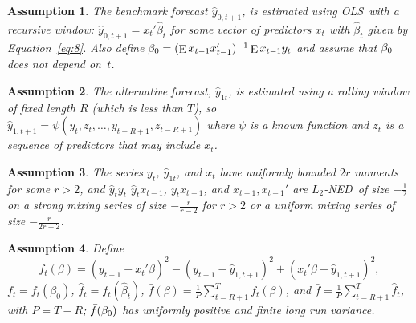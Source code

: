 \documentclass[12pt,fleqn]{article}
\newtheorem{asmp}{Assumption}
\theoremstyle{definition}
\DeclareMathOperator{\E}{E}
\newcommand{\btrue}[1][]{\if#1*\hat\beta_{T+1}\else\beta_0\fi}
\newcommand{\osum}[1]{\sum_{#1=R+1}^T}
\newcommand{\oavg}[1]{\tfrac{1}{P} \osum{#1}}
\newcommand{\ned}{NED}
\newcommand{\ols}{OLS}
\begin{document}
\begin{asmp}\label{a1}%
  The benchmark forecast $\hat{y}_{0,t+1}$, is estimated using \ols\
  with a recursive window: $\hat{y}_{0,t+1} = x_t'\hat{\beta}_t$ for
  some vector of predictors $x_t$ with $\hat{\beta}_t$ given by
  Equation~\eqref{eq:8}.  Also define $\btrue = (\E x_{t-1}
  x_{t-1}')^{-1} \E x_{t-1} y_t$ and assume that $\btrue$ does not
  depend on~$t$.
\end{asmp}

\begin{asmp}\label{a2}%
  The alternative forecast, $\hat{y}_{1t}$, is estimated using a
  rolling window of fixed length $R$ (which is less than $T$), so
  $\hat{y}_{1,t+1} = \psi(y_t,z_t,\dots,y_{t-R+1}, z_{t-R+1})$ where
  $\psi$ is a known function and $z_t$ is a sequence of predictors
  that may include $x_t$.
\end{asmp}

\begin{asmp}\label{a3}%
  The series $y_t$, $\hat{y}_{1t}$, and $x_t$ have uniformly bounded
  $2 r$ moments for some $r > 2$, and $\hat y_t y_t$ $\hat y_t
  x_{t-1}$, $y_t x_{t-1}$, and $x_{t-1}, x_{t-1}'$ are $L_2$-\ned\ of
  size $-\frac12$ on a strong mixing series of size $-\frac{r}{r-2}$
  for $r>2$ or a uniform mixing series of size $-\frac{r}{2r-2}$.
\end{asmp}

\begin{asmp}\label{a4}%
  Define \[f_t(\beta) = (y_{t+1} - x_t'\beta)^2 - (y_{t+1} -
  \hat{y}_{1,t+1})^2 + (x_t'\beta - \hat{y}_{1,t+1})^2,\] $f_t =
  f_t(\beta_0)$, $\hat f_t = f_t(\hat\beta_t)$, $\bar{f}(\beta) =
  \oavg{t} f_t(\beta)$, and $\bar f = \tfrac1P \sum_{t=R+1}^{T} \hat
  f_t$, with $P = T - R$; $\bar f(\btrue)$ has uniformly positive and
  finite long run variance.
\end{asmp}
\end{document}
